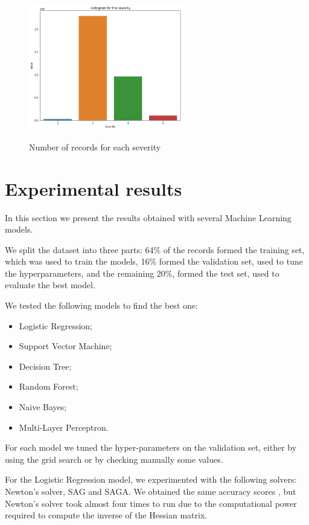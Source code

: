 \documentclass{article}
\begin{document}
\begin{figure}[h!]
\centering
\includegraphics[width=0.6\textwidth]{unbalanced-dataset}
\label{img:unbalanced-dataset}
\caption{Number of records for each severity}
\end{figure}

\section{Experimental results}
In this section we present the results obtained with several Machine Learning models.

We split the dataset into three parts: 64\% of the records formed the training set, which was used to train the models, 16\% formed the validation set, used to tune the hyperparameters, and the remaining 20\%, formed the test set, used to evaluate the best model.

We tested the following models to find the best one:

\begin{itemize}
\item Logistic Regression;
\item Support Vector Machine;
\item Decision Tree;
\item Random Forest;
\item Naive Bayes;
\item Multi-Layer Perceptron.
\end{itemize}

For each model we tuned the hyper-parameters on the validation set, either by using the grid search or by checking manually some values.

For the Logistic Regression model, we experimented with the following solvers: Newton's solver, SAG and SAGA. We obtained the same accuracy scores , but Newton's solver took almost four times to run due to the computational power required to compute the inverse of the Hessian matrix.
\end{document}
